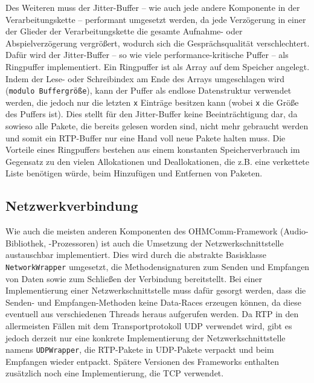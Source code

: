 Des Weiteren muss der Jitter-Buffer -- wie auch jede andere Komponente in der Verarbeitungskette -- performant umgesetzt werden, da jede Verzögerung in einer der Glieder der Verarbeitungskette die gesamte Aufnahme- oder Abspielverzögerung vergrößert, wodurch sich die Gesprächsqualität verschlechtert. Dafür wird der Jitter-Buffer -- so wie viele performance-kritische Puffer -- als Ringpuffer implementiert. Ein Ringpuffer ist als Array auf dem Speicher angelegt. Indem der Lese- oder Schreibindex am Ende des Arrays umgeschlagen wird (\texttt{modulo Buffergröße}), kann der Puffer als endlose Datenstruktur verwendet werden, die jedoch nur die letzten \texttt{x} Einträge besitzen kann (wobei \texttt{x} die Größe des Puffers ist). Dies stellt für den Jitter-Buffer keine Beeinträchtigung dar, da sowieso alle Pakete, die bereits gelesen worden sind, nicht mehr gebraucht werden und somit ein RTP-Buffer nur eine Hand voll neue Pakete halten muss. Die Vorteile eines Ringpuffers bestehen aus einem konstanten Speicherverbrauch im Gegensatz zu den vielen Allokationen und Deallokationen, die z.B. eine verkettete Liste benötigen würde, beim Hinzufügen und Entfernen von Paketen.
\subsection{Netzwerkverbindung}
Wie auch die meisten anderen Komponenten des OHMComm-Framework (Audio-Bibliothek, -Prozessoren) ist auch die Umsetzung der Netzwerkschnittstelle austauschbar implementiert. Dies wird durch die abstrakte Basisklasse \texttt{NetworkWrap\-per} umgesetzt, die Methodensignaturen zum Senden und Empfangen von Daten sowie zum Schließen der Verbindung bereitstellt. Bei einer Implementierung einer Netzwerkschnittstelle muss dafür gesorgt werden, dass die Senden- und Empfangen-Methoden keine Data-Races erzeugen können, da diese eventuell aus verschiedenen Threads heraus aufgerufen werden. Da RTP in den allermeisten Fällen mit dem Transportprotokoll UDP verwendet wird, gibt es jedoch derzeit nur eine konkrete Implementierung der Netzwerkschnittstelle namens \texttt{UDPWrapper}, die RTP-Pakete in UDP-Pakete verpackt und beim Empfangen wieder entpackt. Spätere Versionen des Frameworks enthalten zusätzlich noch eine Implementierung, die TCP verwendet.

\FloatBarrier

